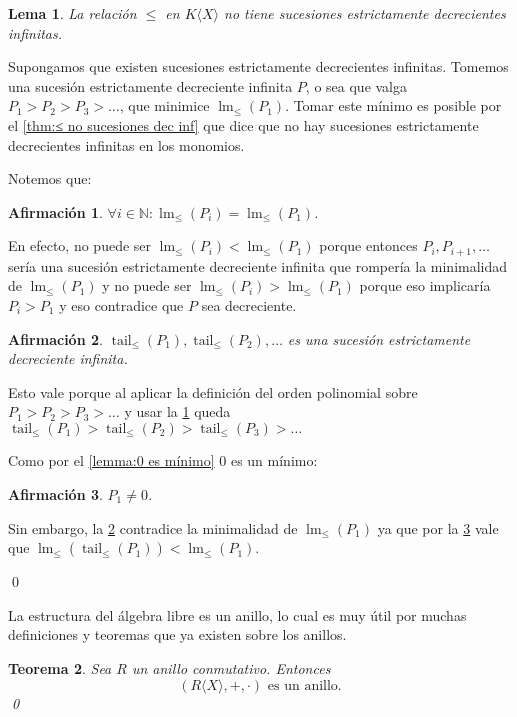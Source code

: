 \documentclass[12pt]{report}
\theoremstyle{customstyle}
\newtheorem{theorem}{Teorema}[chapter]
\newtheorem{lemma}[theorem]{Lema}
\renewenvironment{proof}[1][\proofname]{{\noindent \bfseries #1: }}{\qed} %
\theoremstyle{factstyle}
\newtheorem{fact}{Afirmación}[theorem]
\DeclareMathOperator{\lm}{lm}
\DeclareMathOperator{\tail}{tail}
\begin{document}
\begin{lemma}\label{lemma:≤ en KX no sucesiones dec inf}
  La relación $≤$ en $K⟨X⟩$ no tiene sucesiones estrictamente decrecientes infinitas.
\end{lemma}
\begin{proof}
  Supongamos que existen sucesiones estrictamente decrecientes infinitas. Tomemos una sucesión estrictamente decreciente infinita $P$, o sea que valga $P_1 > P_2 > P_3 > …$, que minimice $\lm_≤(P_1)$. Tomar este mínimo es posible por el \cref{thm:≤ no sucesiones dec inf} que dice que no hay sucesiones estrictamente decrecientes infinitas en los monomios.

  Notemos que:

  \begin{fact}\label{fact:≤ en KX no sucesiones dec inf:1}
    $∀i ∈ ℕ : \lm_≤(P_i) = \lm_≤(P_1)$.
  \end{fact}
  En efecto, no puede ser $\lm_≤(P_i) < \lm_≤(P_1)$ porque entonces $P_i, P_{i + 1}, …$ sería una sucesión estrictamente decreciente infinita que rompería la minimalidad de $\lm_≤(P_1)$ y no puede ser $\lm_≤(P_i) > \lm_≤(P_1)$ porque eso implicaría $P_i > P_1$ y eso contradice que $P$ sea decreciente.

  \begin{fact}\label{fact:≤ en KX no sucesiones dec inf:2}
    $\tail_≤(P_1), \tail_≤(P_2), …$ es una sucesión estrictamente decreciente infinita.
  \end{fact}
  Esto vale porque al aplicar la definición del orden polinomial sobre $P_1 > P_2 > P_3 > …$ y usar la \cref{fact:≤ en KX no sucesiones dec inf:1} queda $\tail_≤(P_1) > \tail_≤(P_2) > \tail_≤(P_3) > …$

  Como por el \cref{lemma:0 es mínimo} $0$ es un mínimo:

  \begin{fact}\label{fact:≤ en KX no sucesiones dec inf:3}
    $P_1 ≠ 0$.
  \end{fact}

  Sin embargo, la \cref{fact:≤ en KX no sucesiones dec inf:2} contradice la minimalidad de $\lm_≤(P_1)$ ya que por la \cref{fact:≤ en KX no sucesiones dec inf:3} vale que $\lm_≤(\tail_≤(P_1)) < \lm_≤(P_1)$.

\end{proof}

La estructura del álgebra libre es un anillo, lo cual es muy útil por muchas definiciones y teoremas que ya existen sobre los anillos.

\begin{theorem}
  Sea $R$ un anillo conmutativo. Entonces
  \[ (R⟨X⟩, +, ·)\text{ es un anillo} \text{.}\]
  \qed
\end{theorem}
\end{document}
